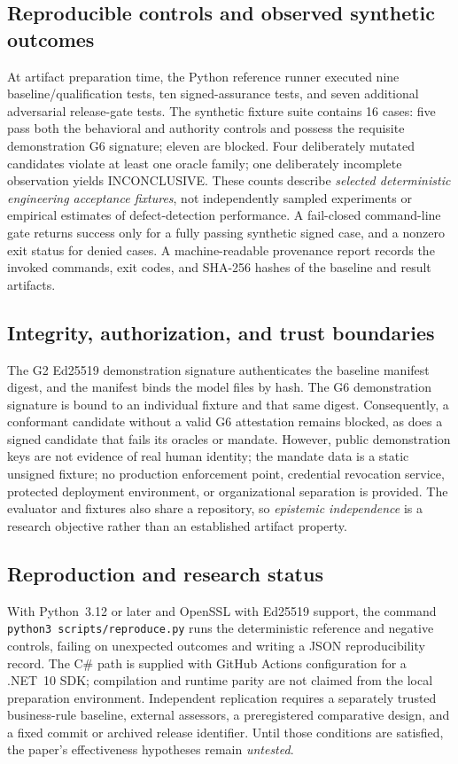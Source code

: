 \documentclass[11pt,a4paper]{article}
\newcommand{\INC}{\textsf{INCONCLUSIVE}}
\begin{document}
\subsection{Reproducible controls and observed synthetic outcomes}
At artifact preparation time, the Python reference runner executed nine baseline/qualification tests, ten signed-assurance tests, and seven additional adversarial release-gate tests. The synthetic fixture suite contains 16 cases: five pass both the behavioral and authority controls and possess the requisite demonstration G6 signature; eleven are blocked. Four deliberately mutated candidates violate at least one oracle family; one deliberately incomplete observation yields \INC{}. These counts describe \emph{selected deterministic engineering acceptance fixtures}, not independently sampled experiments or empirical estimates of defect-detection performance. A fail-closed command-line gate returns success only for a fully passing synthetic signed case, and a nonzero exit status for denied cases. A machine-readable provenance report records the invoked commands, exit codes, and SHA-256 hashes of the baseline and result artifacts.

\subsection{Integrity, authorization, and trust boundaries}
The G2 Ed25519 demonstration signature authenticates the baseline manifest digest, and the manifest binds the model files by hash. The G6 demonstration signature is bound to an individual fixture and that same digest. Consequently, a conformant candidate without a valid G6 attestation remains blocked, as does a signed candidate that fails its oracles or mandate. However, public demonstration keys are not evidence of real human identity; the mandate data is a static unsigned fixture; no production enforcement point, credential revocation service, protected deployment environment, or organizational separation is provided. The evaluator and fixtures also share a repository, so \emph{epistemic independence} is a research objective rather than an established artifact property.

\subsection{Reproduction and research status}
With Python~3.12 or later and OpenSSL with Ed25519 support, the command \texttt{python3 scripts/reproduce.py} runs the deterministic reference and negative controls, failing on unexpected outcomes and writing a JSON reproducibility record. The C\# path is supplied with GitHub Actions configuration for a .NET~10 SDK; compilation and runtime parity are not claimed from the local preparation environment. Independent replication requires a separately trusted business-rule baseline, external assessors, a preregistered comparative design, and a fixed commit or archived release identifier. Until those conditions are satisfied, the paper's effectiveness hypotheses remain \emph{untested}.
\end{document}
